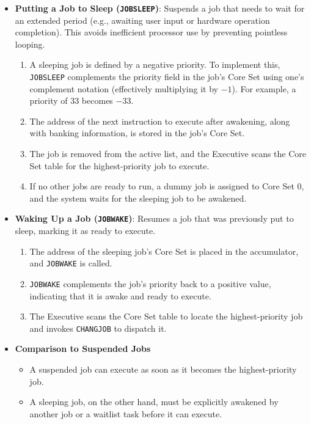 \documentclass[refcap, oxford]{ahsan}
\begin{document}
\begin{itemize}
    \item \textbf{Putting a Job to Sleep (\texttt{JOBSLEEP})}: Suspends a job that
        needs to wait for an extended period (e.g., awaiting user input or hardware
        operation completion). This avoids inefficient processor use by preventing
        pointless looping.
        \begin{enumerate}
            \item A sleeping job is defined by a negative priority. To implement this,
                \texttt{JOBSLEEP} complements the priority field in the job's Core Set
                using one's complement notation (effectively multiplying it by $-1$).
                For example, a priority of $33$ becomes $-33$.
            \item The address of the next instruction to execute after awakening, along
                with banking information, is stored in the job's Core Set.
            \item The job is removed from the active list, and the Executive scans the
                Core Set table for the highest-priority job to execute.
            \item If no other jobs are ready to run, a dummy job is assigned to Core
                Set 0, and the system waits for the sleeping job to be awakened.
        \end{enumerate}

    \item \textbf{Waking Up a Job (\texttt{JOBWAKE})}: Resumes a job that was
        previously put to sleep, marking it as ready to execute.
        \begin{enumerate}
            \item The address of the sleeping job's Core Set is placed in the
                accumulator, and \texttt{JOBWAKE} is called.
            \item \texttt{JOBWAKE} complements the job's priority back to a positive
                value, indicating that it is awake and ready to execute.
            \item The Executive scans the Core Set table to locate the highest-priority
                job and invokes \texttt{CHANGJOB} to dispatch it.
        \end{enumerate}

    \item \textbf{Comparison to Suspended Jobs}
        \begin{itemize}
            \item A suspended job can execute as soon as it becomes the
                highest-priority job.
            \item A sleeping job, on the other hand, must be explicitly awakened by
                another job or a waitlist task before it can execute.
        \end{itemize}


\end{itemize}
\end{document}
